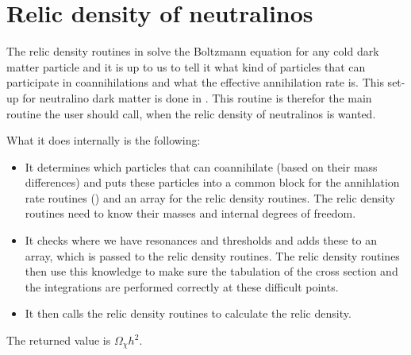 
\section{Relic density of neutralinos}

The relic density routines in  solve the Boltzmann
equation for any cold dark matter particle and it is up to us to tell
it what kind of particles that can participate in coannihilations and
what the effective annihilation rate is. This set-up for neutralino
dark matter is done in . This routine is therefor the
main routine the user should call, when the relic density of
neutralinos is wanted. 

What it does internally is the following:
\begin{itemize}
  \item It determines which particles that can coannihilate (based on
    their mass differences) and puts these particles into a common
    block for the annihlation rate routines () and an
    array for the relic density routines. The relic density routines
    need to know their masses and internal degrees of freedom.
  \item It checks where we have resonances and thresholds and adds
    these to an array, which is passed to the relic density
    routines. The relic density routines then use this knowledge to
    make sure the tabulation of the cross section and the integrations
    are performed correctly at these difficult points.
  \item It then calls the relic density routines to calculate the
    relic density.
\end{itemize}

The returned value is $\Omega_\chi h^2$.
